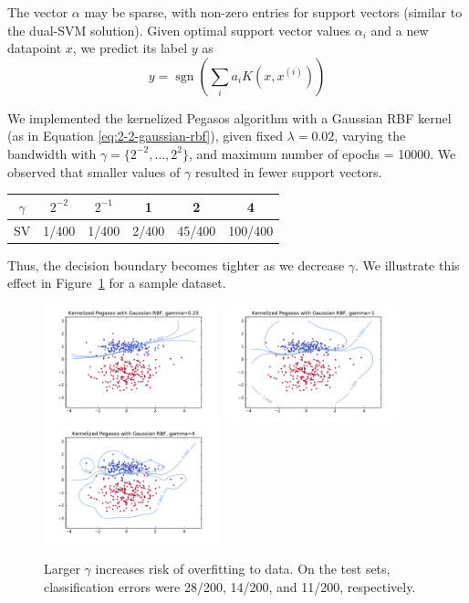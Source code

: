 \documentclass{article}
\DeclareMathOperator{\sgn}{sgn}
\begin{document}
\begin{multicols}{2}
The vector $\alpha$ may be sparse, with non-zero entries for support vectors (similar to the dual-SVM solution). Given optimal support vector values $\alpha_i$ and a new datapoint $x$, we predict its label $y$ as
\begin{equation}
    y = \sgn\left(\sum_i{a_i K(x,x^{(i)})}\right)
\end{equation}

We implemented the kernelized Pegasos algorithm with a Gaussian RBF kernel
(as in Equation \ref{eq:2-2-gaussian-rbf}), given fixed $\lambda = 0.02$, varying the bandwidth with $\gamma = \{2^{-2},\dots,2^2\}$, and maximum number of epochs = 10000.
We observed that smaller values of $\gamma$ resulted in fewer support vectors.

\begin{center}
\begin{tabular}{|c||c|c|c|c|c|}
\hline
$\gamma$ & $2^{-2}$ & $2^{-1}$ & 1 & 2 & 4\\ \hline
SV & 1/400 & 1/400 & 2/400 & 45/400 & 100/400 \\ \hline
\end{tabular}
\end{center}
Thus, the decision boundary becomes tighter as we decrease $\gamma$. We illustrate this effect in Figure~\ref{fig:3-3-gamma} for a sample dataset.

\begin{figure}[t]
   \centering
	\includegraphics[width=2in]{img/3-2-margins/3-3-kernel-025.pdf}
	\includegraphics[width=2in]{img/3-2-margins/3-3-kernel-1.pdf}
	\includegraphics[width=2in]{img/3-2-margins/3-3-kernel-4.pdf}
   \caption{Larger $\gamma$ increases risk of overfitting to data. On the test sets, classification errors were 28/200, 14/200, and 11/200, respectively.}
   \label{fig:3-3-gamma}
\end{figure}


\end{multicols}
\end{document}
